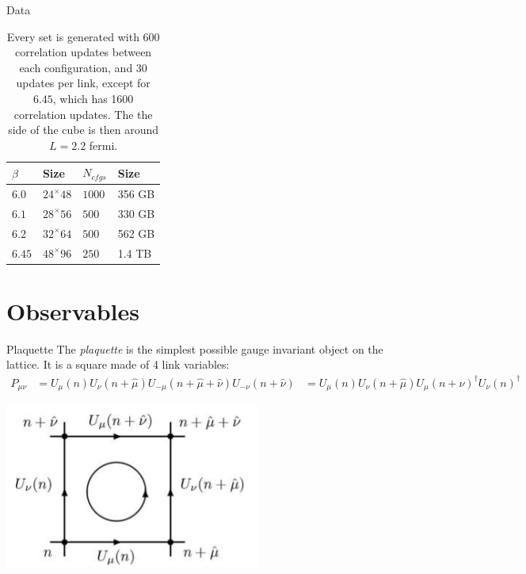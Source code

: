 \documentclass[10pt]{beamer}
\begin{document}
\begin{frame}{Data}
	\begin{table}
		\caption{Every set is generated with 600 correlation updates between each configuration, and 30 updates per link, except for $6.45$, which has 1600 correlation updates. The the side of the cube is then around $L=2.2$ fermi.}
		\begin{tabular}{l | l | l | l}
			$\beta$ & Size & $N_{cfgs}$ & Size \\ \hline
			$6.0$ & $24^\times 48$ & $1000$ & 356 GB \\
			$6.1$ & $28^\times 56$ & $500$ & 330 GB\\
			$6.2$ & $32^\times 64$ & $500$ & 562 GB\\
			$6.45$ & $48^\times 96$ & $250$ & 1.4 TB\\
		\end{tabular}
		\label{tab:data_batches}
	\end{table}
\end{frame}

\section{Observables}

\begin{frame}{Plaquette}
	The \textit{plaquette} is the simplest possible gauge invariant object on the lattice. It is a square made of 4 link variables:
	\begin{align}
		P_{\mu\nu} &= U_\mu(n)U_\nu(n+\hat{\mu})U_{-\mu}(n+\hat{\mu}+\hat{\nu})U_{-\nu}(n+\hat{\nu}) 
		&= U_\mu(n)U_\nu(n+\hat{\mu})U_{\mu}(n+\hat{\nu})^\dagger U_{\nu}(n)^\dagger
	\end{align}
	\begin{center}
		\includegraphics[scale=0.4]{figures/plaq.png}
	\end{center}
\end{frame}
\end{document}
